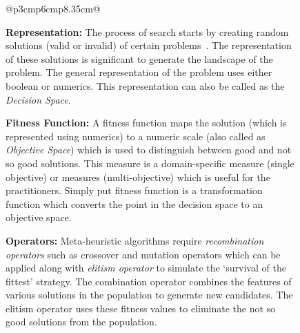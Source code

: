 \documentclass[table, xcdraw, sigconf,review, anonymous]{acmart}
\begin{document}
\begin{figure}
{\begin{tabular}{@{}p{3cm}p{6cm}p{8.35cm}@{}}
{\begin{minipage}[b]{\linewidth}
\noindent\textbf{Representation: } The process of search starts by creating random solutions (valid or invalid) of certain problems~\cite{saber2017seeding, chen2017beyond, chen2017sampling, henard2015combining}. 
The representation of these solutions is significant to generate the landscape of the problem. The general representation of the problem uses either boolean or numerics. This representation can also be called as the \textit{Decision Space}.

\noindent\textbf{Fitness Function: } A fitness function maps the solution (which is represented using numerics) to a numeric scale (also called as \textit{Objective Space}) which is used to distinguish between good and not so good solutions. This measure is a domain-specific measure (single objective) or measures (multi-objective) which is useful for the practitioners.
Simply put fitness function is a transformation function which converts the point in the decision space to an objective space. 

\noindent\textbf{Operators: } Meta-heuristic algorithms require \textit{recombination operators} such as crossover and mutation operators which can be applied along with \textit{elitism operator} to simulate the `survival of the fittest' strategy. The combination operator combines the features of various solutions in the population to generate new candidates. The elitism operator uses these fitness values to eliminate the not so good solutions from the population. 
\end{minipage}
}
 \\
 \\ 
{}
\end{tabular}}
\end{figure}
\end{document}
